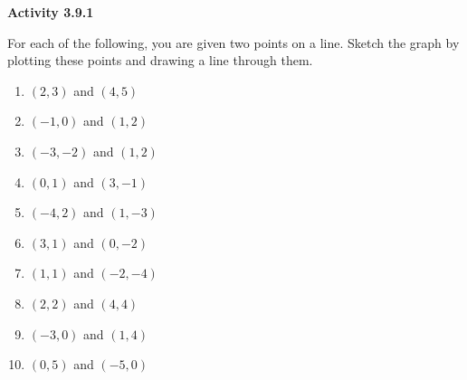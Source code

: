  \vspace{1ex}
\noindent\textbf{Activity 3.9.1}

\vspace{0.75ex}



For each of the following, you are given two points on a line. Sketch the graph by plotting these points and drawing a line through them.
\begin{multicols}{2}
\begin{enumerate}[noitemsep, label = \color{blue}\arabic*. ]
    \item $(2, 3)$ and $(4, 5)$
    \item $(-1, 0)$ and $(1, 2)$
    \item $(-3, -2)$ and $(1, 2)$
    \item $(0, 1)$ and $(3, -1)$
    \item $(-4, 2)$ and $(1, -3)$
    \item $(3, 1)$ and $(0, -2)$
    \item $(1, 1)$ and $(-2, -4)$
    \item $(2, 2)$ and $(4, 4)$
    \item $(-3, 0)$ and $(1, 4)$
    \item $(0, 5)$ and $(-5, 0)$
\end{enumerate}
\end{multicols}
